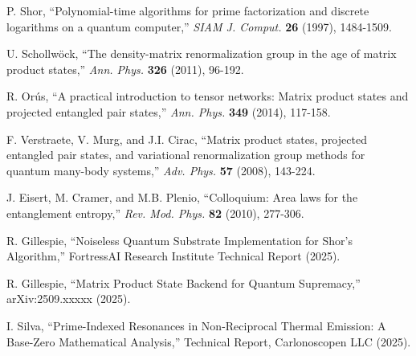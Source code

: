 \documentclass[12pt]{article}
\begin{document}
\begin{thebibliography}{10}

P. Shor, ``Polynomial-time algorithms for prime factorization and discrete logarithms on a quantum computer,'' \emph{SIAM J. Comput.} \textbf{26} (1997), 1484-1509.

U. Schollwöck, ``The density-matrix renormalization group in the age of matrix product states,'' \emph{Ann. Phys.} \textbf{326} (2011), 96-192.

R. Orús, ``A practical introduction to tensor networks: Matrix product states and projected entangled pair states,'' \emph{Ann. Phys.} \textbf{349} (2014), 117-158.

F. Verstraete, V. Murg, and J.I. Cirac, ``Matrix product states, projected entangled pair states, and variational renormalization group methods for quantum many-body systems,'' \emph{Adv. Phys.} \textbf{57} (2008), 143-224.

J. Eisert, M. Cramer, and M.B. Plenio, ``Colloquium: Area laws for the entanglement entropy,'' \emph{Rev. Mod. Phys.} \textbf{82} (2010), 277-306.

R. Gillespie, ``Noiseless Quantum Substrate Implementation for Shor's Algorithm,'' FortressAI Research Institute Technical Report (2025).

R. Gillespie, ``Matrix Product State Backend for Quantum Supremacy,'' arXiv:2509.xxxxx (2025).

I. Silva, ``Prime-Indexed Resonances in Non-Reciprocal Thermal Emission: A Base-Zero Mathematical Analysis,'' Technical Report, Carlonoscopen LLC (2025).

\end{thebibliography}
\end{document}
